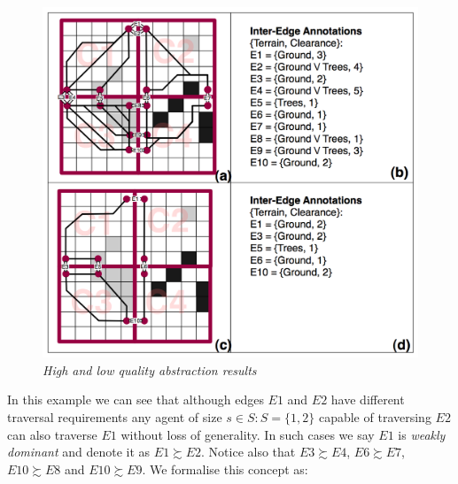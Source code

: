 \begin{figure}[htbp]
	\vspace{-12pt}
        \caption{\emph{High and low quality abstraction results} }
        \begin{center}
                        \includegraphics[scale=0.25, trim = 20mm 12mm 20mm 5mm]{diagrams/abstraction_result.png}
        \end{center}
        \label{aha-fig:abstractgraph}
	\vspace{-6pt}
\end{figure}
\par \indent
In this example we can see that although edges $E1$ and $E2$ have different traversal requirements any agent of size $s \in S : S = \lbrace 1, 2 \rbrace$ capable of traversing $E2$ can also traverse $E1$ without loss of generality. 
In such cases we say $E1$ is \emph{weakly dominant} and denote it as $E1 \succsim E2$. 
Notice also that $E3 \succsim E4$, $E6 \succsim E7$, $E10 \succsim E8$ and $E10 \succsim E9$.
We formalise this concept as:
